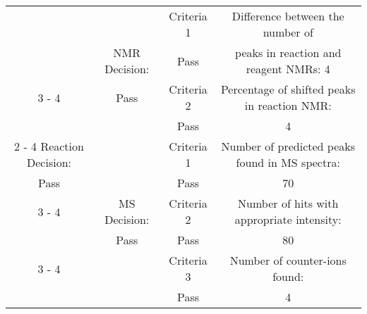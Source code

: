\documentclass{article}%
\begin{document}
%
\normalsize%
\begin{tabular}{|c|c|c|c|}%
\hline%
&&Criteria 1&Difference between the number of\\%
&NMR Decision:&Pass&peaks in reaction and reagent NMRs: 4\\%
\cline{3%
-%
4}%
&Pass&Criteria 2&Percentage of shifted peaks in reaction NMR:\\%
&&Pass&4\\%
\cline{2%
-%
4}%
Reaction Decision:&&Criteria 1&Number of predicted peaks found in MS spectra:\\%
Pass&&Pass&70\\%
\cline{3%
-%
4}%
&MS Decision:&Criteria 2&Number of hits with appropriate intensity:\\%
&Pass&Pass&80\\%
\cline{3%
-%
4}%
&&Criteria 3&Number of counter{-}ions found:\\%
&&Pass&4\\%
\hline%
\end{tabular}%
\end{document}
